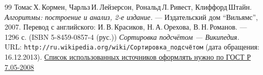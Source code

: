 \begin{thebibliography}{99}
Томас\,Х.\,Кормен, Чарльз\,И.\,Лейзерсон, Рональд\,Л.\,Ривест, Клиффорд\,Штайн.
{\itshape Алгоритмы: построение и анализ, 2-е издание.} --- Издательский дом \enquote{Вильямс}, 2007. Перевод с английского: И.\,В.\,Красиков, Н.\,А.\,Орехова, В.\,Н.\,Романов. --- 1296 с. (ISBN 5-8459-0857-4 (рус.))
{\itshape Сортировка подсчётом — Википедия.} \\URL: \texttt{http://ru.wikipedia.org/wiki/Сортировка\_подсчётом} (дата обращения: 16.12.2013).
\href{http://www.ifap.ru/library/gost/7052008.pdf}{Список использованных источников оформлять нужно по  ГОСТ Р 7.05-2008}
\end{thebibliography}
\pagebreak